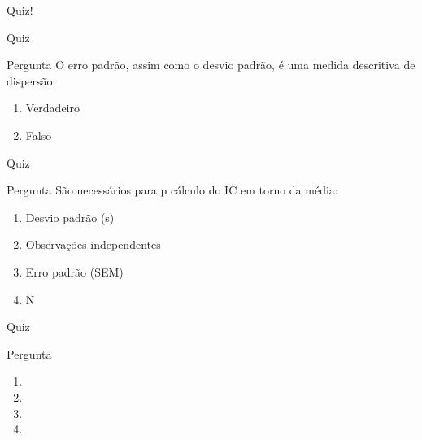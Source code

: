 \documentclass{beamer}
\begin{document}
\begin{frame}
  \begin{center}
    \LARGE
    Quiz!
  \end{center}
\end{frame}

\begin{frame}{\scriptsize Quiz}
  \begin{block}{Pergunta}
    \footnotesize
    O erro padrão, assim como o desvio padrão, é uma medida descritiva de dispersão:

    \bigskip
    \begin{enumerate}
      \scriptsize
    \item Verdadeiro
    \item \alert<2>{Falso}
    \end{enumerate}
  \end{block}
\end{frame}

\begin{frame}{\scriptsize Quiz}
  \begin{block}{Pergunta}
    \footnotesize
    São necessários para p cálculo do IC em torno da média:

    \bigskip
    \begin{enumerate}
      \scriptsize
    \item \alert<2>{Desvio padrão (s)}
    \item \alert<2>{Observações independentes}
    \item \alert<2>{Erro padrão (SEM)}
    \item \alert<2>{N}
    \end{enumerate}
  \end{block}
\end{frame}

\begin{frame}{\scriptsize Quiz}
  \begin{block}{Pergunta}
    \footnotesize
    

    \bigskip
    \begin{enumerate}
      \scriptsize
    \item 
    \item 
    \item 
    \item 
    \end{enumerate}
  \end{block}
\end{frame}
\end{document}

